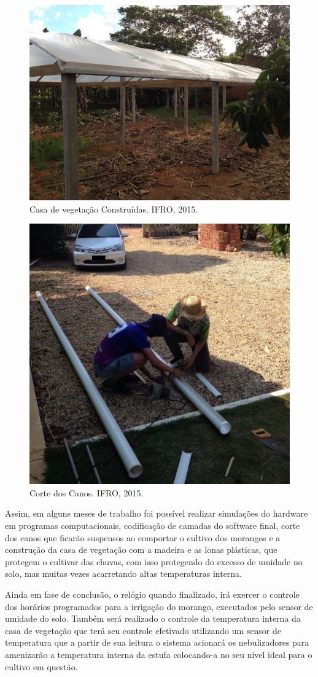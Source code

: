 \documentclass[article,12pt,onesidea,4paper,english,brazil]{abntex2}
\begin{document}
	\begin{figure}[h]
		\centering
		\includegraphics[width=.6\linewidth]{pip-156-01}
		\caption{Casa de vegetação Construídas. IFRO, 2015.}
	\end{figure} 

\begin{figure}[!h]
	\centering
	\includegraphics[width=.6\linewidth]{pip-156-02}
	\caption{Corte dos Canos. IFRO, 2015.}
\end{figure}

	
	Assim, em alguns meses de trabalho foi possível realizar simulações do hardware em programas computacionais, codificação de camadas do software final, corte dos canos que ficarão suspensos ao comportar o cultivo dos morangos e a construção da casa de vegetação com a madeira e as lonas plásticas, que protegem o cultivar das chuvas, com isso protegendo do excesso de umidade no solo, mas muitas vezes acarretando altas temperaturas interna.
	
	Ainda em fase de conclusão, o relógio quando finalizado, irá exercer o controle dos horários programados para a irrigação do morango, executados pelo sensor de umidade do solo. Também será realizado o controle da temperatura interna da casa de vegetação que terá seu controle efetivado utilizando um sensor de temperatura que a partir de sua leitura o sistema acionará os nebulizadores para amenizarão a temperatura interna da estufa colocando-a no seu nível ideal para o cultivo em questão.
	
\end{document}
